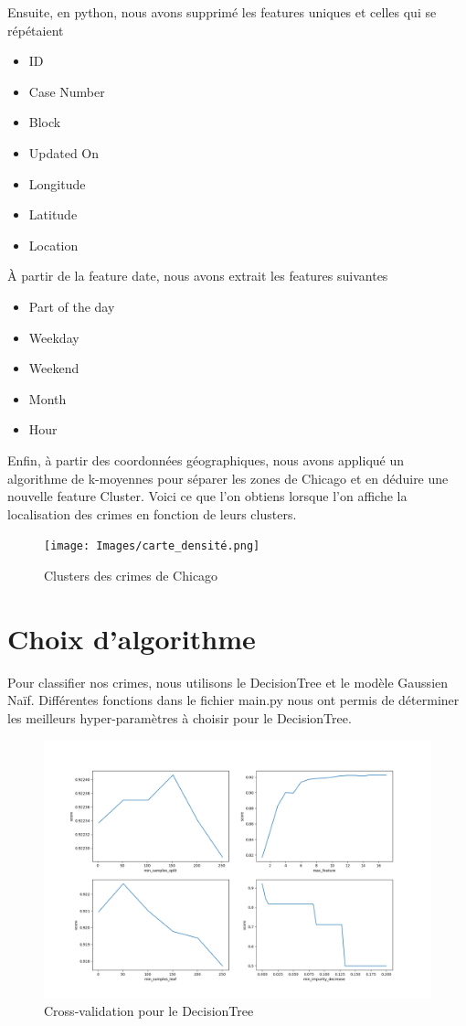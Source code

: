 \documentclass{article}
\begin{document}
    Ensuite, en python, nous avons supprimé les features uniques et celles qui se répétaient
    \begin{itemize}
	    \item ID
	    \item Case Number
	    \item Block
	    \item Updated On
	    \item Longitude
	    \item Latitude
	    \item Location
    \end{itemize}
    À partir de la feature date, nous avons extrait les features suivantes
    \begin{itemize}
	    \item Part of the day
	    \item Weekday
	    \item Weekend
	    \item Month
	    \item Hour
    \end{itemize}
    Enfin, à partir des coordonnées géographiques, nous avons appliqué un algorithme de k-moyennes pour séparer les zones de Chicago et en déduire une nouvelle feature Cluster. 
    Voici ce que l'on obtiens lorsque l'on affiche la localisation des crimes en fonction de leurs clusters.
    \begin{figure}[H]
            \centering
	    \texttt{[image: Images/carte\_densité.png]}
	    \caption{Clusters des crimes de Chicago}
    \end{figure}

    \section{Choix d'algorithme}
    Pour classifier nos crimes, nous utilisons le DecisionTree et le modèle Gaussien Naïf.
    Différentes fonctions dans le fichier main.py nous ont permis de déterminer les meilleurs
    hyper-paramètres à choisir pour le DecisionTree.
    \begin{figure}[H]
            \centering
	    \includegraphics[scale=.4]{bestParamDecisionTree.png}
	    \caption{Cross-validation pour le DecisionTree}
    \end{figure}
\end{document}
